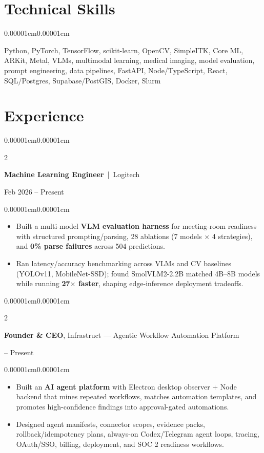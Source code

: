 \documentclass[10pt, letterpaper]{article}
\newenvironment{highlights}{
  \begin{itemize}[topsep=0.04cm, parsep=0.02cm, partopsep=0pt, itemsep=0pt, leftmargin=10pt]
}{
  \end{itemize}
}
\newenvironment{onecolentry}{
  \begin{adjustwidth}{0.00001cm}{0.00001cm}
}{
  \end{adjustwidth}
}
\newenvironment{twocolentry}[2][]{
  \onecolentry
  \def\secondColumn{#2}
  \setcolumnwidth{\fill,4.5cm}
  \begin{paracol}{2}
}{
  \switchcolumn \raggedleft \secondColumn
  \end{paracol}
  \endonecolentry
}
\begin{document}
  \section{Technical Skills}
  \begin{onecolentry}
    \small Python, PyTorch, TensorFlow, scikit-learn, OpenCV, SimpleITK, Core ML, ARKit, Metal, VLMs, multimodal learning, medical imaging, model evaluation, prompt engineering, data pipelines, FastAPI, Node/TypeScript, React, SQL/Postgres, Supabase/PostGIS, Docker, Slurm
  \end{onecolentry}

  \section{Experience}

  \begin{twocolentry}{Feb 2026 -- Present}
    \textbf{Machine Learning Engineer} \,|\, 
    Logitech
  \end{twocolentry}
  \begin{onecolentry}
    \begin{highlights}
      \item Built a multi-model \textbf{VLM evaluation harness} for meeting-room readiness with structured prompting/parsing, 28 ablations (7 models $\times$ 4 strategies), and \textbf{0\% parse failures} across 504 predictions.
      \item Ran latency/accuracy benchmarking across VLMs and CV baselines (YOLOv11, MobileNet-SSD); found SmolVLM2-2.2B matched 4B--8B models while running \textbf{27$\times$ faster}, shaping edge-inference deployment tradeoffs.
    \end{highlights}
  \end{onecolentry}

  \begin{twocolentry}{2026 -- Present}
    \textbf{Founder \& CEO}, Infrastruct --- Agentic Workflow Automation Platform
  \end{twocolentry}
  \begin{onecolentry}
    \begin{highlights}
      \item Built an \textbf{AI agent platform} with Electron desktop observer + Node backend that mines repeated workflows, matches automation templates, and promotes high-confidence findings into approval-gated automations.
      \item Designed agent manifests, connector scopes, evidence packs, rollback/idempotency plans, always-on Codex/Telegram agent loops, tracing, OAuth/SSO, billing, deployment, and SOC 2 readiness workflows.
    \end{highlights}
  \end{onecolentry}
\end{document}
